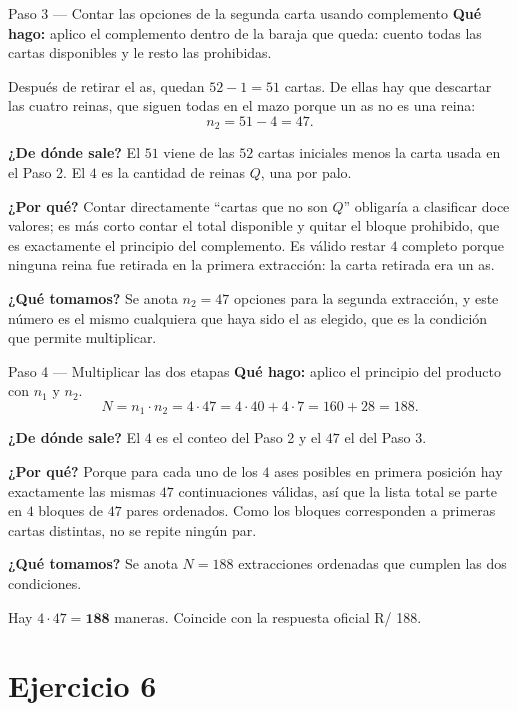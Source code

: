 \documentclass[11pt]{article}
\begin{document}
\begin{paso}{Paso 3 --- Contar las opciones de la segunda carta usando complemento}
\textbf{Qué hago:} aplico el complemento dentro de la baraja que queda: cuento todas las cartas disponibles y le resto las prohibidas.

Después de retirar el as, quedan $52-1=51$ cartas. De ellas hay que descartar las cuatro reinas, que siguen todas en el mazo porque un as no es una reina:
\[
  n_2 = 51-4 = 47 .
\]

\textbf{¿De dónde sale?} El $51$ viene de las $52$ cartas iniciales menos la carta usada en el Paso 2. El $4$ es la cantidad de reinas $Q$, una por palo.

\textbf{¿Por qué?} Contar directamente ``cartas que no son $Q$'' obligaría a clasificar doce valores; es más corto contar el total disponible y quitar el bloque prohibido, que es exactamente el principio del complemento. Es válido restar $4$ completo porque ninguna reina fue retirada en la primera extracción: la carta retirada era un as.

\textbf{¿Qué tomamos?} Se anota $n_2=47$ opciones para la segunda extracción, y este número es el mismo cualquiera que haya sido el as elegido, que es la condición que permite multiplicar.
\end{paso}

\begin{paso}{Paso 4 --- Multiplicar las dos etapas}
\textbf{Qué hago:} aplico el principio del producto con $n_1$ y $n_2$.
\[
  N = n_1\cdot n_2 = 4\cdot 47 = 4\cdot 40 + 4\cdot 7 = 160+28 = 188 .
\]

\textbf{¿De dónde sale?} El $4$ es el conteo del Paso 2 y el $47$ el del Paso 3.

\textbf{¿Por qué?} Porque para cada uno de los $4$ ases posibles en primera posición hay exactamente las mismas $47$ continuaciones válidas, así que la lista total se parte en $4$ bloques de $47$ pares ordenados. Como los bloques corresponden a primeras cartas distintas, no se repite ningún par.

\textbf{¿Qué tomamos?} Se anota $N=188$ extracciones ordenadas que cumplen las dos condiciones.
\end{paso}

\begin{resp}
Hay $4\cdot 47=\mathbf{188}$ maneras. Coincide con la respuesta oficial R/ 188.
\end{resp}

\section*{Ejercicio 6}
\end{document}
